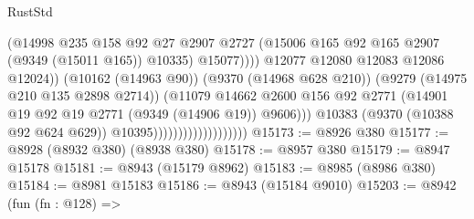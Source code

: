 \begin{lexlean}{RustStd}
\begin{coremodule}
                                                      (@14998
                                                        @235
                                                        @158
                                                        @92
                                                        @27
                                                        @2907
                                                        @2727
                                                        (@15006
                                                          @165
                                                          @92
                                                          @165
                                                          @2907
                                                          (@9349 (@15011 @165))
                                                          @10335)
                                                        @15077))))
                                                @12077
                                                @12080
                                                @12083
                                                @12086
                                                @12024))
                                            (@10162 (@14963 @90))
                                            (@9370 (@14968 @628 @210))
                                            (@9279 (@14975 @210 @135 @2898 @2714))
                                            (@11079
                                              @14662
                                              @2600
                                              @156
                                              @92
                                              @2771
                                              (@14901
                                                @19
                                                @92
                                                @19
                                                @2771
                                                (@9349 (@14906 @19))
                                                @9606)))
                                          @10383
                                          (@9370 (@10388 @92 @624 @629))
                                          @10395)))))))))))))))))))
@15173 := @8926 @380
@15177 := @8928 (@8932 @380) (@8938 @380)
@15178 := @8957 @380
@15179 := @8947 @15178
@15181 := @8943 (@15179 @8962)
@15183 := @8985 (@8986 @380)
@15184 := @8981 @15183
@15186 := @8943 (@15184 @9010)
@15203 := @8942
    (fun (fn : @128) =>

\end{coremodule}
\end{lexlean}
